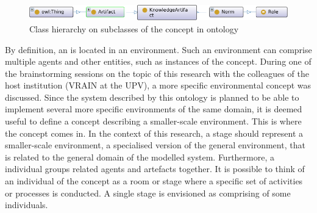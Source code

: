 \begin{figure}
    \centering
    \includegraphics[width=0.84\linewidth]{Deliverables/Phase 1/Figures/Hierarchy artefact KNartefact norm role.png}
    \caption{Class hierarchy on subclasses of the  concept in  ontology}
    \label{fig: Hierarchy artefact KNartefact norm role}
\end{figure}

 By definition, an  is located in an environment. Such an environment can comprise multiple agents and other entities, such as instances of the  concept. During one of the brainstorming sessions on the topic of this research with the colleagues of the host institution (\acf{VRAIN} at the \ac{UPV}), a more specific environmental concept was discussed. Since the system described by this ontology is planned to be able to implement several more specific environments of the same domain, it is deemed useful to define a concept describing a smaller-scale environment. This is where the  concept comes in. In the context of this research, a stage should represent a smaller-scale environment, a specialised version of the general environment, that is related to the general domain of the modelled system.
Furthermore, a  individual groups related agents and artefacts together. It is possible to think of an individual of the  concept as a room or stage where a specific set of activities or processes is conducted. A single stage is envisioned as comprising of some  individuals.



